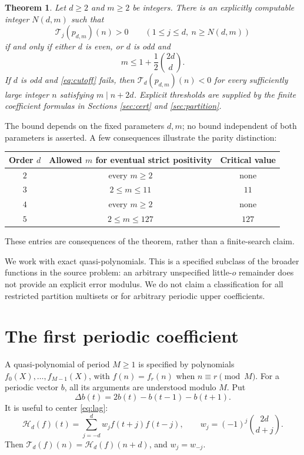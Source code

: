 \documentclass[11pt,reqno]{amsart}
\newtheorem{theorem}{Theorem}[section]
\theoremstyle{remark}
\newcommand{\Lag}{\mathcal{T}}
\newcommand{\cenLag}{\mathcal{H}}
\newcommand{\Dlt}{\Delta}
\begin{document}
\begin{theorem}\label{thm:main}
Let \(d\ge2\) and \(m\ge2\) be integers. There is an explicitly computable
integer \(N(d,m)\) such that
\[
 \Lag_j(p_{d,m})(n)>0
 \qquad(1\le j\le d,\ n\ge N(d,m))
\]
if and only if either \(d\) is even, or \(d\) is odd and
\begin{equation}\label{eq:cutoff}
 m\le 1+\frac12\binom{2d}{d}.
\end{equation}
If \(d\) is odd and \eqref{eq:cutoff} fails, then
\(\Lag_d(p_{d,m})(n)<0\) for every sufficiently large integer \(n\) satisfying
\(m\mid n+2d\). Explicit thresholds are supplied by the finite coefficient
formulas in Sections \ref{sec:cert} and \ref{sec:partition}.
\end{theorem}

The bound depends on the fixed parameters \(d,m\); no bound independent of
both parameters is asserted. A few consequences illustrate the parity
distinction:
\begin{center}
\begin{tabular}{ccc}
\toprule
Order \(d\) & Allowed \(m\) for eventual strict positivity & Critical value\\
\midrule
\(2\) & every \(m\ge2\) & none\\
\(3\) & \(2\le m\le11\) & \(11\)\\
\(4\) & every \(m\ge2\) & none\\
\(5\) & \(2\le m\le127\) & \(127\)\\
\bottomrule
\end{tabular}
\end{center}
These entries are consequences of the theorem, rather than a finite-search
claim.

We work with exact quasi-polynomials. This is a specified subclass of the
broader functions in the source problem: an arbitrary unspecified
little-\(o\) remainder does not provide an explicit error modulus.
We do not claim a classification for all restricted partition multisets
or for arbitrary periodic upper coefficients.

\section{The first periodic coefficient}\label{sec:boundary}

A quasi-polynomial of period \(M\ge1\) is specified by polynomials
\(f_0(X),\ldots,f_{M-1}(X)\), with \(f(n)=f_r(n)\) when \(n\equiv r\pmod M\).
For a periodic vector \(b\), all its arguments are understood modulo \(M\).
Put
\[
 \Dlt b(t)=2b(t)-b(t-1)-b(t+1).
\]
It is useful to center \eqref{eq:lag}:
\[
 \cenLag_d(f)(t)=\sum_{j=-d}^{d}w_jf(t+j)f(t-j),
 \qquad w_j=(-1)^j\binom{2d}{d+j}.
\]
Then \(\Lag_d(f)(n)=\cenLag_d(f)(n+d)\), and \(w_j=w_{-j}\).
\end{document}
